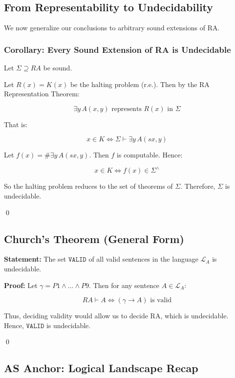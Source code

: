 \documentclass[12pt]{article}
\begin{document}
\subsection{From Representability to Undecidability}

We now generalize our conclusions to arbitrary sound extensions of RA.

\subsubsection*{Corollary: Every Sound Extension of RA is Undecidable}

Let \( \Sigma \supseteq RA \) be sound.

Let \( R(x) = K(x) \) be the halting problem (r.e.). Then by the RA Representation Theorem:

\[
\exists y\, A(x, y) \text{ represents } R(x) \text{ in } \Sigma
\]

That is:

\[
x \in K \iff \Sigma \vdash \exists y\, A(sx, y)
\]

Let \( f(x) = \#\exists y\, A(sx, y) \). Then \( f \) is computable. Hence:

\[
x \in K \iff f(x) \in \Sigma^\wedge
\]

So the halting problem reduces to the set of theorems of \( \Sigma \). Therefore, \( \Sigma \) is undecidable.

\qed

\subsection{Church's Theorem (General Form)}

\textbf{Statement:} The set \( \texttt{VALID} \) of all valid sentences in the language \( \mathcal{L}_A \) is undecidable.

\textbf{Proof:} Let \( \gamma = P1 \wedge \dots \wedge P9 \). Then for any sentence \( A \in \mathcal{L}_A \):

\[
RA \vdash A \iff (\gamma \rightarrow A) \text{ is valid}
\]

Thus, deciding validity would allow us to decide RA, which is undecidable. Hence, \( \texttt{VALID} \) is undecidable.

\qed

\subsection*{AS Anchor: Logical Landscape Recap}
\end{document}
